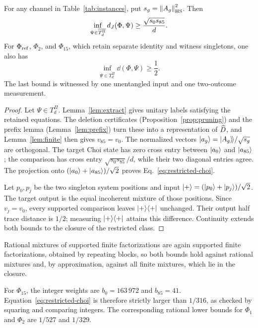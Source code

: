 \documentclass[11pt]{article}
\begin{document}
\begin{theorem}\label{thm:support}
For any channel in Table~\ref{tab:instances}, put $s_g=\left\lVert A_g\right\rVert_{\mathrm{HS}}^2$.
Then
\begin{equation}
 \inf_{\Psi\in\overline{T_d^\Pi}}d_J(\Phi,\Psi)
 \ge \frac{\sqrt{s_0s_{85}}}{d}.
 \label{eq:restricted-choi}
\end{equation}
For $\Phi_{\mathrm{ref}}$, $\Phi_2$, and $\Phi_{15}$, which retain separate identity and witness
singletons, one also has
\begin{equation}
 \inf_{\Psi\in\overline{T_d^\Pi}}\dd(\Phi,\Psi)\ge\frac12.
 \label{eq:restricted-diamond}
\end{equation}
The last bound is witnessed by one unentangled input and one two-outcome measurement.
\end{theorem}
\begin{proof}
Let $\Psi\in T_d^\Pi$. Lemma~\ref{lem:extract} gives unitary labels satisfying the retained
equations. The deletion certificates (Proposition~\ref{prop:pruning}) and the prefix lemma
(Lemma~\ref{lem:prefix}) turn these into
a representation of $\widehat D$, and Lemma~\ref{lem:finite} then gives $v_{85}=v_0$.
The normalized vectors $\lvert a_g\rangle=\lvert A_g\rangle\!\rangle/\sqrt{s_g}$ are orthogonal. The target Choi
state has zero cross entry between $\lvert a_0\rangle$ and $\lvert a_{85}\rangle$; the comparison has
cross entry $\sqrt{s_0s_{85}}/d$, while their two diagonal entries agree.
The projection onto $(\lvert a_0\rangle+\lvert a_{85}\rangle)/\sqrt2$ proves
Eq.~\eqref{eq:restricted-choi}.

Let $p_0,p_j$ be the two singleton system positions and input
$\lvert +\rangle=(\lvert p_0\rangle+\lvert p_j\rangle)/\sqrt2$. The target output is the equal incoherent mixture
of those positions. Since $v_j=v_0$, every supported comparison leaves $\lvert +\rangle\langle +\rvert$
unchanged. Their output half trace distance is $1/2$; measuring $\lvert +\rangle\langle +\rvert$ attains
this difference. Continuity extends both bounds to the closure of the restricted class.
\end{proof}

Rational mixtures of supported finite factorizations are again supported finite
factorizations, obtained by repeating blocks, so both bounds hold against rational mixtures
and, by approximation, against all finite mixtures, which lie in the closure.

For $\Phi_{15}$, the integer weights are $b_0=163\,972$ and $b_{85}=41$.
Equation~\eqref{eq:restricted-choi} is therefore strictly larger than $1/316$, as checked by
squaring and comparing integers. The corresponding rational lower bounds for $\Phi_1$
and $\Phi_2$ are $1/527$ and $1/329$.
\end{document}
